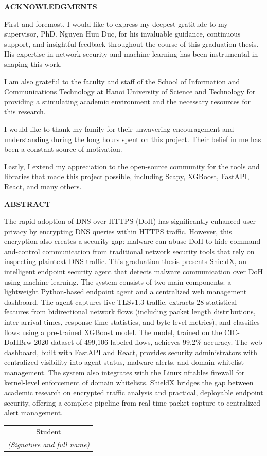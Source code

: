 \documentclass[../Main.tex]{subfiles}
\begin{document}
\begin{center}
    \Large{\textbf{ACKNOWLEDGMENTS}}\\
\end{center}
\vspace{0.5cm}

First and foremost, I would like to express my deepest gratitude to my supervisor, PhD. Nguyen Huu Duc, for his invaluable guidance, continuous support, and insightful feedback throughout the course of this graduation thesis. His expertise in network security and machine learning has been instrumental in shaping this work.

I am also grateful to the faculty and staff of the School of Information and Communications Technology at Hanoi University of Science and Technology for providing a stimulating academic environment and the necessary resources for this research.

I would like to thank my family for their unwavering encouragement and understanding during the long hours spent on this project. Their belief in me has been a constant source of motivation.

Lastly, I extend my appreciation to the open-source community for the tools and libraries that made this project possible, including Scapy, XGBoost, FastAPI, React, and many others.

\vspace{0.8cm}

\begin{center}
    \Large{\textbf{ABSTRACT}}\\
\end{center}
\vspace{0.5cm}

The rapid adoption of DNS-over-HTTPS (DoH) has significantly enhanced user privacy by encrypting DNS queries within HTTPS traffic. However, this encryption also creates a security gap: malware can abuse DoH to hide command-and-control communication from traditional network security tools that rely on inspecting plaintext DNS traffic. This graduation thesis presents ShieldX, an intelligent endpoint security agent that detects malware communication over DoH using machine learning. The system consists of two main components: a lightweight Python-based endpoint agent and a centralized web management dashboard. The agent captures live TLSv1.3 traffic, extracts 28 statistical features from bidirectional network flows (including packet length distributions, inter-arrival times, response time statistics, and byte-level metrics), and classifies flows using a pre-trained XGBoost model. The model, trained on the CIC-DoHBrw-2020 dataset of 499,106 labeled flows, achieves 99.2\% accuracy. The web dashboard, built with FastAPI and React, provides security administrators with centralized visibility into agent status, malware alerts, and domain whitelist management. The system also integrates with the Linux nftables firewall for kernel-level enforcement of domain whitelists. ShieldX bridges the gap between academic research on encrypted traffic analysis and practical, deployable endpoint security, offering a complete pipeline from real-time packet capture to centralized alert management.

\begin{flushright}
\begin{tabular}{@{}c@{}}
Student\\
\textit{(Signature and full name)}
\end{tabular}
\end{flushright}
\end{document}
